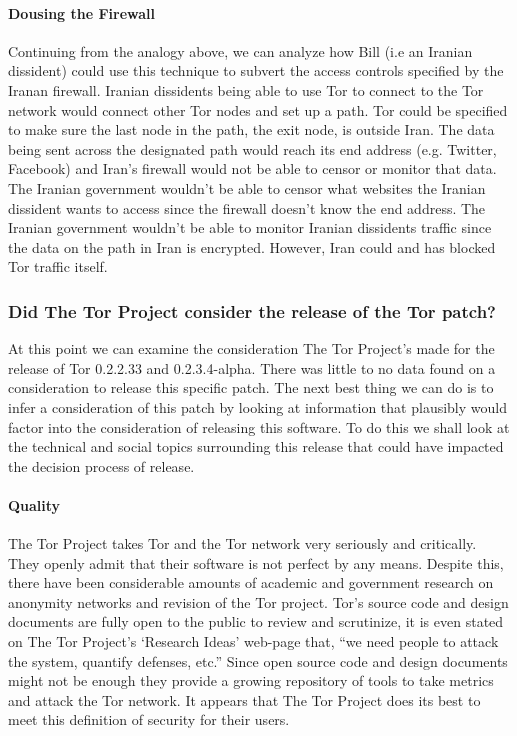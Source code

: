 \documentclass[11pt]{article}
\begin{document}
\begin{multicols}{2}
\paragraph{Dousing the Firewall}

Continuing from the analogy above, we can analyze how Bill (i.e an Iranian
dissident) could use this technique to subvert the access controls specified by
the Iranan firewall. Iranian dissidents being able to use Tor to connect to the
Tor network would connect other Tor nodes and set up a path. Tor could be
specified to make sure the last node in the path, the exit node, is outside Iran.\cite{
Tor:SpecificExitNode, Tor:FAQ} The data being sent across the designated
path would reach its end address (e.g.  Twitter, Facebook) and Iran's firewall
would not be able to censor or monitor that data. The Iranian government
wouldn't be able to censor what websites the Iranian dissident wants to access
since the firewall doesn't know the end address. The Iranian government wouldn't
be able to monitor Iranian dissidents traffic since the data on the path in Iran
is encrypted. However, Iran could and has blocked Tor traffic
itself.

\subsubsection{Did The Tor Project consider the release of the Tor patch?} 

At this point we can examine the consideration The Tor Project's made for the
release of Tor 0.2.2.33 and 0.2.3.4-alpha. There was little to no data found on
a consideration to release this specific patch. The next best thing we
can do is to infer a consideration of this patch by looking at information that
plausibly would factor into the consideration of releasing this software. To do
this we shall look at the technical and social topics surrounding this release
that could have impacted the decision process of release.

\paragraph{Quality}

The Tor Project takes Tor and the Tor network very seriously and critically.
They openly admit that their software is not perfect by any means. Despite this,
there have been considerable amounts of academic and government research on
anonymity networks and revision of the Tor project.\cite{Tor:ResearchPaper}
Tor's source code and design documents are fully open to the public to review
and scrutinize, it is even stated on The Tor Project's `Research Ideas'
web-page that, ``we need people to attack the system, quantify defenses, etc.''\cite{
Tor:ResearchIdeas, Tor:2011} Since open source code and design documents
might not be enough  they provide a growing repository of tools to take metrics
and attack the Tor network.\cite{Tor:ResearchHome}
It appears that The Tor Project does its best to meet this definition of
security for their users.  


\end{multicols}
\end{document}
